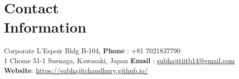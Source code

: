 \documentclass[margin,line]{res}
\begin{document}
\begin{resume}
\section{}
\vspace{.05in}

\section{\sc Contact\\Information}
Corporate L'Espoir Bldg B-104,  \hfill \textbf{Phone} : +81 7021837790 \\
1 Chome 51-1 Suenaga, Kawasaki, Japan   \hfill \textbf{Email} : \href{mailto:subhajitiitb14@gmail.com}{subhajitiitb14@gmail.com} \\
\textbf{Website}: \url{https://subhajitchaudhury.github.io/}\\


\end{resume}
\end{document}
